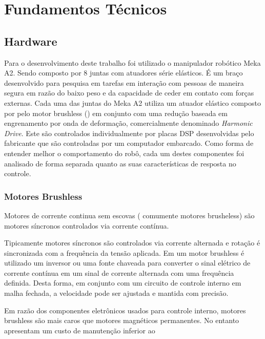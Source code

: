 \chapter{Fundamentos Técnicos}

\section{Hardware}

Para o desenvolvimento deste trabalho foi utilizado o manipulador robótico Meka A2. Sendo composto por 8 juntas com atuadores série elásticos. É um braço desenvolvido para pesquisa em tarefas em interação com pessoas de maneira segura em razão do baixo peso e da capacidade de ceder em contato com forças externas. 
Cada uma das juntas do Meka A2 utiliza um atuador elástico composto por pelo motor brushless () em conjunto com uma redução baseada em engrenamento por onda de deformação, comercialmente denominado \textit{Harmonic Drive}. Este são controlados individualmente por placas DSP desenvolvidas pelo fabricante que são controladas por um computador embarcado. Como forma de entender melhor o comportamento do robô, cada um destes componentes foi analisado de forma separada quanto as suas características de resposta no controle.

\subsection{Motores Brushless}

Motores de corrente continua sem escovas ( comumente motores brusheless) são motores síncronos controlados via corrente contínua.

Tipicamente motores síncronos são controlados via corrente alternada e rotação é sincronizada com a frequência da tensão aplicada. Em um motor brushless é utilizado um inversor ou uma fonte chaveada para converter o sinal elétrico de corrente contínua em um sinal de corrente alternada com uma frequência definida. Desta forma, em conjunto com um circuito de controle interno em malha fechada, a velocidade pode ser ajustada e mantida com precisão. \cite{nobody}

Em razão dos componentes eletrônicos usados para controle interno, motores brushless são mais caros que motores magnéticos permanentes. No entanto apresentam um custo de manutenção inferior ao


